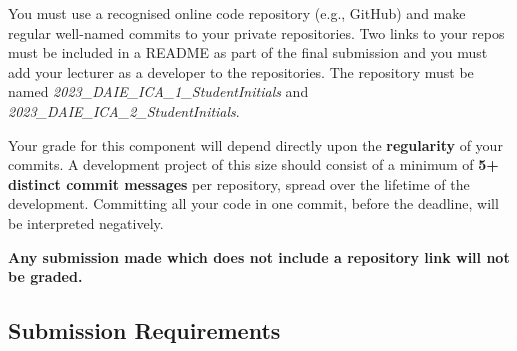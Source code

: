 \documentclass[
  letterpaper,
  DIV=11,
  numbers=noendperiod]{scrartcl}
\begin{document}
You must use a recognised online code repository (e.g., GitHub) and make
regular well-named commits to your private repositories. Two links to
your repos must be included in a README as part of the final submission
and you must add your lecturer as a developer to the repositories. The
repository must be named \emph{2023\_DAIE\_ICA\_1\_StudentInitials} and
\emph{2023\_DAIE\_ICA\_2\_StudentInitials}.

Your grade for this component will depend directly upon the
\textbf{regularity} of your commits. A development project of this size
should consist of a minimum of \textbf{5+ distinct commit messages} per
repository, spread over the lifetime of the development. Committing all
your code in one commit, before the deadline, will be interpreted
negatively.

\textbf{Any submission made which does not include a repository link
will not be graded.}

\subsection{Submission Requirements}\label{submission-requirements}
\end{document}

